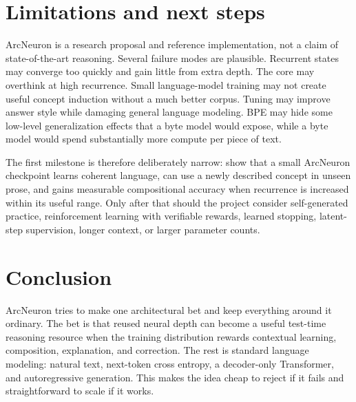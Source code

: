 \documentclass[10pt]{article}
\begin{document}
\section{Limitations and next steps}

ArcNeuron is a research proposal and reference implementation, not a claim of state-of-the-art reasoning. Several failure modes are plausible. Recurrent states may converge too quickly and gain little from extra depth. The core may overthink at high recurrence. Small language-model training may not create useful concept induction without a much better corpus. Tuning may improve answer style while damaging general language modeling. BPE may hide some low-level generalization effects that a byte model would expose, while a byte model would spend substantially more compute per piece of text.

The first milestone is therefore deliberately narrow: show that a small ArcNeuron checkpoint learns coherent language, can use a newly described concept in unseen prose, and gains measurable compositional accuracy when recurrence is increased within its useful range. Only after that should the project consider self-generated practice, reinforcement learning with verifiable rewards, learned stopping, latent-step supervision, longer context, or larger parameter counts.

\section{Conclusion}

ArcNeuron tries to make one architectural bet and keep everything around it ordinary. The bet is that reused neural depth can become a useful test-time reasoning resource when the training distribution rewards contextual learning, composition, explanation, and correction. The rest is standard language modeling: natural text, next-token cross entropy, a decoder-only Transformer, and autoregressive generation. This makes the idea cheap to reject if it fails and straightforward to scale if it works.
\end{document}

